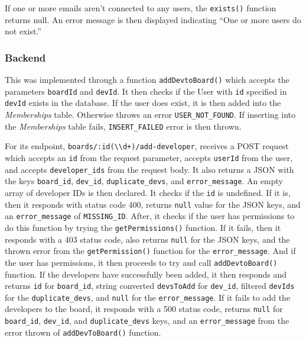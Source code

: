 \documentclass{article}
\def\code#1{\texttt{#1}}
\begin{document}
If one or more emails aren’t connected to any users, the \code{exists()}
function returns null. An error message is then displayed indicating “One or
more users do not exist.”

\subsubsection{Backend}
This was implemented through a function \code{addDevtoBoard()} which accepts the
parameters \code{boardId} and \code{devId}. It then checks if the User with
\code{id} specified in \code{devId} exists in the database. If the user does
exist, it is then added into the \emph{Memberships} table. Otherwise throws an
error \code{USER\_NOT\_FOUND}. If inserting into the \emph{Memberships} table
fails, \code{INSERT\_FAILED} error is then thrown.

For its endpoint,
\code{boards/:id(\textbackslash{}\textbackslash{}d+)/add-developer}, receives a
POST request which accepts an \code{id} from the request parameter, accepts
\code{userId} from the user, and accepts \code{developer\_ids} from the request
body. It also returns a JSON with the keys \code{board\_id}, \code{dev\_id},
\code{duplicate\_devs}, and \code{error\_message}. An empty array of developer
IDs is then declared. It checks if the \code{id} is undefined. If it is, then it
responds with status code 400, returns \code{null} value for the JSON keys, and
an \code{error\_message} of \code{MISSING\_ID}. After, it checks if the user has
permissions to do this function by trying the \code{getPermissions()} function.
If it fails, then it responds with a 403 status code, also returns \code{null}
for the JSON keys, and the thrown error from the \code{getPermission()} function
for the \code{error\_message}. And if the user has permissions, it then proceeds
to try and call \code{addDevtoBoard()} function. If the developers have
successfully been added, it then responds and returns \code{id} for
\code{board\_id}, string converted \code{devsToAdd} for \code{dev\_id}, filtered
\code{devIds} for the \code{duplicate\_devs}, and \code{null} for the
\code{error\_message}. If it fails to add the developers to the board, it
responds with a 500 status code, returns \code{null} for \code{board\_id},
\code{dev\_id}, and \code{duplicate\_devs} keys, and an \code{error\_message}
from the error thrown of \code{addDevToBoard()} function.
\end{document}
